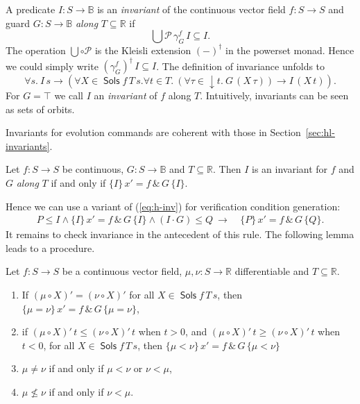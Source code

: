 \documentclass[envcountsame,envcountsect]{llncs}
\newcommand{\Pow}{\mathcal{P}}
\newcommand{\reals}{\mathbb{R}}
\newcommand{\bools}{\mathbb{B}}
\newcommand{\Sols}{\mathop{\mathsf{Sols}}}
\begin{document}
A predicate $I:S\to\bools$ is an \emph{invariant} of the continuous
vector field $f:S\to S$ and guard $G:S\to\bools$ \emph{along}
$T\subseteq \reals$ if
\begin{equation*}
\bigcup \Pow\, \gamma^f_G\, I\subseteq  I.
\end{equation*}
The operation $\bigcup\circ\Pow$ is the Kleisli extension $(-)^\dagger$
in the powerset monad. Hence we could simply write
$(\gamma^f_G)^\dagger\, I \subseteq I$. The definition of invariance
unfolds to
\begin{equation*}
  \forall s.\ I\, s \to (\forall X\in\Sols f\, T\, s.\forall t\in T.\ (\forall \tau\in {\downarrow}t.\ G\, (X\, \tau)) \to I\, (X\, t)).
\end{equation*}
For $G=\top$ we call $I$ an \emph{invariant} of $f$ along $T$.
Intuitively, invariants can be seen as sets of orbits.

Invariants for evolution commands are coherent with those in Section~\ref{sec:hl-invariants}.
\begin{proposition}\label{P:inv-prop}
  Let $f:S\to S$ be continuous, $G:S\to\bools$ and
  $T\subseteq \reals$. Then $I$ is an invariant for $f$ and $G$ \emph{along} $T$ if and only if
$ \{I\}\, x' = f\, \&\, G\, \{I\}$.
\end{proposition}
Hence we can use a variant of (\ref{eq:h-inv}) for verification condition generation:
\begin{align}
  P\le I \land \{I\}\, x' = f\, \&\, G\, \{I\}\land (I\cdot G)\le Q\ \rightarrow\
  &\{P\}\, x' = f\, \&\, G\, \{Q\}.\label{eq:h-invg}\tag{h-invg}
\end{align}
It remains to check invariance in the antecedent of this rule. The
following lemma leads to a procedure.

\begin{lemma}\label{P:invrules}
  Let $f:S\to S$ be a continuous vector field, $\mu,\nu:S\to\reals$
  differentiable and $T\subseteq \reals$. 
\begin{enumerate}
\item If $(\mu\circ X)' =(\nu\circ X)'$ for all
  $X\in \Sols f\, T\, s$, then $\{\mu=\nu\}\, x' = f\, \&\, G\, \{\mu=\nu\}$, 
\item if $(\mu\circ X)'\, t\leq(\nu\circ X)'\, t$ when $t> 0$, and $(\mu\circ X)'\, t\geq(\nu\circ X)'\, t$ when $t< 0$, for all $X\in \Sols f\, T\, s$,
  then $\{\mu <\nu\}\, x' = f\, \&\, G\, \{\mu <\nu\}$
\item $\mu\neq \nu$ if and only if $\mu < \nu$ or $\nu < \mu$,
\item $\mu \not\le \nu$ if and only if $\nu < \mu$.
\end{enumerate}
\end{lemma}
\end{document}
